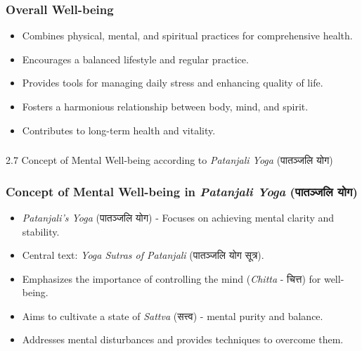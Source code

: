 \begin{frame}[fragile]\frametitle{Overall Well-being}

      \begin{itemize}
		\item Combines physical, mental, and spiritual practices for comprehensive health.
		\item Encourages a balanced lifestyle and regular practice.
		\item Provides tools for managing daily stress and enhancing quality of life.
		\item Fosters a harmonious relationship between body, mind, and spirit.
		\item Contributes to long-term health and vitality.
	  \end{itemize}

\end{frame}



\begin{frame}[fragile]\frametitle{}
\begin{center}
{\Large 2.7  Concept of Mental Well-being according to \textit{Patanjali Yoga} (पातञ्जलि योग)}
\end{center}
\end{frame}

\begin{frame}[fragile]\frametitle{Concept of Mental Well-being in \textit{Patanjali Yoga} (पातञ्जलि योग)}

      \begin{itemize}
		\item \textit{Patanjali's Yoga} (पातञ्जलि योग) - Focuses on achieving mental clarity and stability.
		\item Central text: \textit{Yoga Sutras of Patanjali} (पातञ्जलि योग सूत्र).
		\item Emphasizes the importance of controlling the mind (\textit{Chitta} - चित्त) for well-being.
		\item Aims to cultivate a state of \textit{Sattva} (सत्त्व) - mental purity and balance.
		\item Addresses mental disturbances and provides techniques to overcome them.
	  \end{itemize}

\end{frame}

